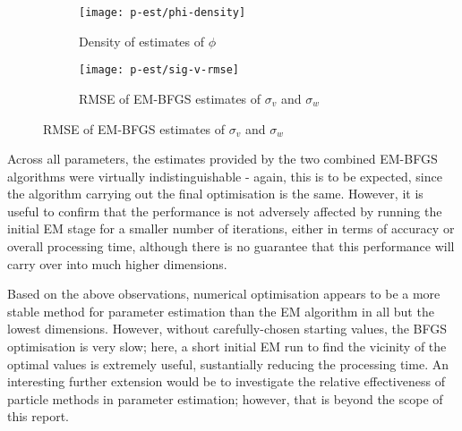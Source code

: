 \documentclass[10pt,fleqn]{article}
\begin{document}
\begin{figure}[H]		%
\caption{Accuracy of parameter estimation}
\centering

	\begin{subfigure}[t]{0.35\textwidth}
		\caption{Density of estimates of $\phi$}
			\label{fig:p-est-phi-density}
		\texttt{[image: p-est/phi-density]}
	\end{subfigure}
	\begin{subfigure}[t]{0.6\textwidth}
		\caption{RMSE of EM-BFGS estimates of $\sigma_v$ and $\sigma_w$}
			\label{fig:p-est-vcov-RMSE}
	\texttt{[image: p-est/sig-v-rmse]}
	\end{subfigure}
	
\end{figure}
Across all parameters, the estimates provided by the two combined EM-BFGS algorithms were virtually indistinguishable - again, this is to be expected, since the algorithm carrying out the final optimisation is the same. However, it is useful to confirm that the performance is not adversely affected by running the initial EM stage for a smaller number of iterations, either in terms of accuracy or overall processing time, although there is no guarantee that this performance will carry over into much higher dimensions.


Based on the above observations, numerical optimisation appears to be a more stable method for parameter estimation than the EM algorithm in all but the lowest dimensions. However, without carefully-chosen starting values, the BFGS optimisation is very slow; here, a short initial EM run to find the vicinity of the optimal values is extremely useful, sustantially reducing the processing time. An interesting further extension would be to investigate the relative effectiveness of particle methods in parameter estimation; however, that is beyond the scope of this report.
\end{document}
